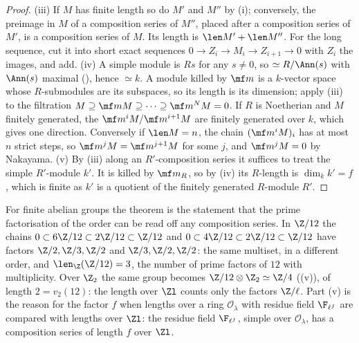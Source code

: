 \begin{proof}
(iii) If $M$ has finite length so do $M'$ and $M''$ by (i); conversely, the preimage in $M$ of a composition series of $M''$, placed after a
composition series of $M'$, is a composition series of $M$. Its length is $\len M'+\len M''$. For the long sequence, cut it into short exact
sequences $0\to Z_i\to M_i\to Z_{i+1}\to0$ with $Z_i$ the images, and add.
(iv) A simple module is $Rs$ for any $s\ne0$, so $\simeq R/\Ann(s)$ with $\Ann(s)$ maximal (), hence $\simeq k$.
A module killed by $\mf m$ is a $k$-vector space whose $R$-submodules are its subspaces, so its length is its dimension; apply (iii) to
the filtration $M\supseteq\mf mM\supseteq\cdots\supseteq\mf m^NM=0$. If $R$ is Noetherian and $M$ finitely generated, the $\mf m^iM/\mf m^{i+1}M$ are finitely
generated over $k$, which gives one direction. Conversely if $\len M=n$, the chain $(\mf m^iM)_i$ has at most $n$ strict steps, so
$\mf m^jM=\mf m^{j+1}M$ for some $j$, and $\mf m^jM=0$ by Nakayama.
(v) By (iii) along an $R'$-composition series it suffices to treat the simple $R'$-module $k'$. It is killed by $\mf m_R$, so by (iv)
its $R$-length is $\dim_kk'=f$, which is finite as $k'$ is a quotient of the finitely generated $R$-module $R'$.
\end{proof}

For finite abelian groups the theorem is the statement that the prime factorisation of the order can be read off any composition
series. In $\Z/12$ the chains $0\subset6\Z/12\subset2\Z/12\subset\Z/12$ and $0\subset4\Z/12\subset2\Z/12\subset\Z/12$ have factors $\Z/2,\Z/3,\Z/2$ and
$\Z/3,\Z/2,\Z/2$: the same multiset, in a different order, and $\len_\Z(\Z/12)=3$, the number of prime factors of $12$ with multiplicity. Over $\Z_2$
the same group becomes $\Z/12\otimes\Z_2\simeq\Z/4$ ((v)), of length $2=v_2(12)$: the length over $\Zl$ counts only the factors
$\Z/\ell$. Part (v) is the reason for the factor $f$ when lengths over a ring $\mathcal O_\lambda$ with residue field $\F_{\ell^f}$ are compared with
lengths over $\Zl$: the residue field $\F_{\ell^f}$, simple over $\mathcal O_\lambda$, has a composition series of length $f$ over $\Zl$.


